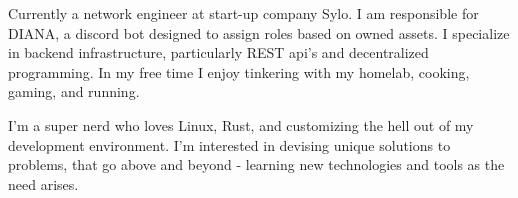 

\begin{cvparagraph}
Currently a network engineer at start-up company Sylo. I am responsible for DIANA, a discord bot designed to assign roles based on owned assets. I specialize in backend infrastructure, particularly REST api's and decentralized programming. In my free time I enjoy tinkering with my homelab, cooking, gaming, and running.

I'm a super nerd who loves Linux, Rust, and customizing the hell out of my development environment. I'm interested in devising unique solutions to problems, that go above and beyond - learning new technologies and tools as the need arises.
\end{cvparagraph}
